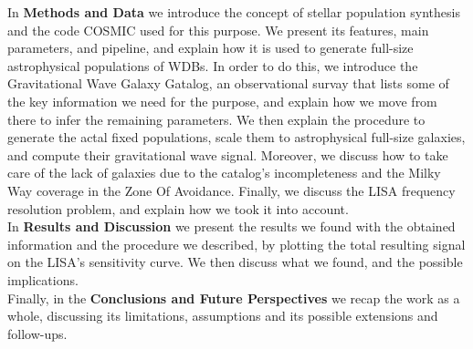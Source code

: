 In \textbf{Methods and Data} we introduce the concept of stellar population synthesis and the code COSMIC used for this purpose.
We present its features, main parameters, and pipeline, and explain how it is used to generate full-size astrophysical populations of WDBs.
In order to do this, we introduce the Gravitational Wave Galaxy Gatalog, an observational survay that lists some of the key information we need for the purpose, and explain how we move from there to infer the remaining parameters.
We then explain the procedure to generate the actal fixed populations, scale them to astrophysical full-size galaxies, and compute their gravitational wave signal. 
Moreover, we discuss how to take care of the lack of galaxies due to the catalog's incompleteness and the Milky Way coverage in the Zone Of Avoidance.
Finally, we discuss the LISA frequency resolution problem, and explain how we took it into account.\vspace{2mm}\\
In \textbf{Results and Discussion} we present the results we found with the obtained information and the procedure we described, by plotting the total resulting signal on the LISA's sensitivity curve.
We then discuss what we found, and the possible implications. \vspace{2mm}\\
Finally, in the \textbf{Conclusions and Future Perspectives} we recap the work as a whole, discussing its limitations, assumptions and its possible extensions and follow-ups.
